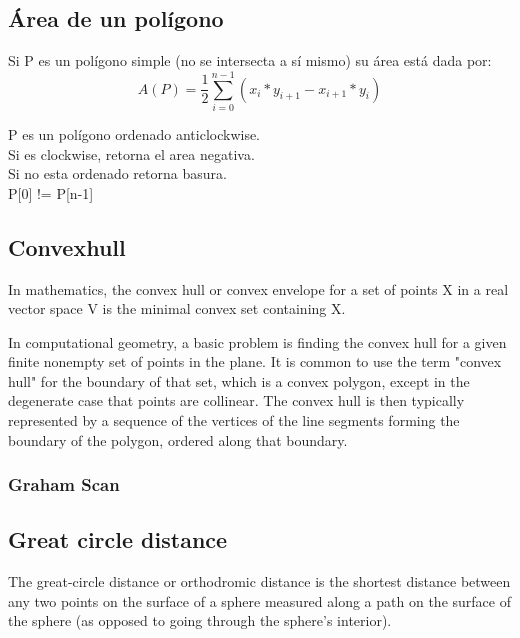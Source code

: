 \documentclass[10pt,letterpaper,twocolumn,twosided]{article}
\newcommand{\codigofuente}[1]{

\dotfill
}
\begin{document}
\codigofuente{src/geom/farthest_point_pair_distance.cpp}

\subsection{Área de un polígono}

Si P es un polígono simple (no se intersecta a sí mismo) su área está dada
por:\\

$$ A(P) = \frac{1}{2} \sum_{i=0}^{n-1} (x_i*y_{i+1}-x_{i+1}*y_i)$$

P es un polígono ordenado anticlockwise.\\
Si es clockwise, retorna el area negativa.\\ 
Si no esta ordenado retorna basura.\\
P[0] != P[n-1]

\codigofuente{src/geom/areapoligono.cpp}

\subsection{Convexhull}

In mathematics, the convex hull or convex envelope for a set of points X in a real vector space V is the minimal convex set containing X.


In computational geometry, a basic problem is finding the convex hull for a given finite nonempty set of points in the plane. It is common to use the term "convex hull" for the boundary of that set, which is a convex polygon, except in the degenerate case that points are collinear. The convex hull is then typically represented by a sequence of the vertices of the line segments forming the boundary of the polygon, ordered along that boundary.

\subsubsection{Graham Scan}

\codigofuente{src/geom/convexhull.cpp}

\subsection{Great circle distance}

The great-circle distance or orthodromic distance is the shortest distance between any two points on the surface of a sphere measured along a path on the surface of the sphere (as opposed to going through the sphere's interior).
\end{document}

